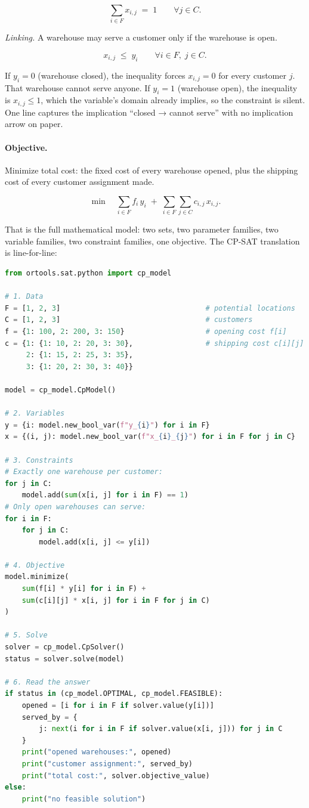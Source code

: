 \[
\sum_{i \in F} x_{i,j} \;=\; 1 \qquad \forall j \in C.
\]

\emph{Linking.} A warehouse may serve a customer only if the warehouse
is open.

\[
x_{i,j} \;\le\; y_i \qquad \forall i \in F, \; j \in C.
\]

If \(y_i = 0\) (warehouse closed), the inequality forces \(x_{i,j} = 0\)
for every customer \(j\). That warehouse cannot serve anyone. If
\(y_i = 1\) (warehouse open), the inequality is \(x_{i,j} \le 1\), which
the variable's domain already implies, so the constraint is silent. One
line captures the implication ``closed → cannot serve'' with no
implication arrow on paper.

\paragraph{Objective.} Minimize total cost: the fixed cost of every
warehouse opened, plus the shipping cost of every customer assignment
made.

\[
\min \quad \sum_{i \in F} f_i \, y_i \;+\; \sum_{i \in F} \sum_{j \in C} c_{i,j} \, x_{i,j}.
\]

That is the full mathematical model: two sets, two parameter families,
two variable families, two constraint families, one objective. The
CP-SAT translation is line-for-line:

\begin{lstlisting}[language=Python]
from ortools.sat.python import cp_model

# 1. Data
F = [1, 2, 3]                                  # potential locations
C = [1, 2, 3]                                  # customers
f = {1: 100, 2: 200, 3: 150}                   # opening cost f[i]
c = {1: {1: 10, 2: 20, 3: 30},                 # shipping cost c[i][j]
     2: {1: 15, 2: 25, 3: 35},
     3: {1: 20, 2: 30, 3: 40}}

model = cp_model.CpModel()

# 2. Variables
y = {i: model.new_bool_var(f"y_{i}") for i in F}
x = {(i, j): model.new_bool_var(f"x_{i}_{j}") for i in F for j in C}

# 3. Constraints
# Exactly one warehouse per customer:
for j in C:
    model.add(sum(x[i, j] for i in F) == 1)
# Only open warehouses can serve:
for i in F:
    for j in C:
        model.add(x[i, j] <= y[i])

# 4. Objective
model.minimize(
    sum(f[i] * y[i] for i in F) +
    sum(c[i][j] * x[i, j] for i in F for j in C)
)

# 5. Solve
solver = cp_model.CpSolver()
status = solver.solve(model)

# 6. Read the answer
if status in (cp_model.OPTIMAL, cp_model.FEASIBLE):
    opened = [i for i in F if solver.value(y[i])]
    served_by = {
        j: next(i for i in F if solver.value(x[i, j])) for j in C
    }
    print("opened warehouses:", opened)
    print("customer assignment:", served_by)
    print("total cost:", solver.objective_value)
else:
    print("no feasible solution")
\end{lstlisting}


